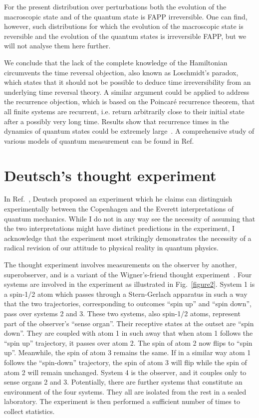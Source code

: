 \documentclass[12pt]{article}
\begin{document}
For the present distribution over perturbations both the evolution of the macroscopic state and of the quantum state is FAPP irreversible. One can find, however, such distributions for which the evolution of the macroscopic state is reversible and the evolution of the quantum states is irreversible FAPP, but we will not analyse them here further. 

We conclude that the lack of the complete knowledge of the Hamiltonian circumvents the time reversal objection, also known as Loschmidt's paradox, which states that it should not be possible to deduce time irreversibility from an underlying time reversal theory. A similar argument could be applied to address the recurrence objection, which is based on the Poincar{\' e} recurrence theorem, that all finite systems are recurrent, i.e. return arbitrarily close to their initial state after a possibly very long time. Results show that recurrence times in the dynamics of quantum states could be extremely large~\cite{peres4}. A comprehensive study of various models of quantum measurement can be found in Ref.~\cite{balian}


\section{Deutsch's thought experiment}

In Ref.~\cite{deutsch}, Deutsch proposed an experiment which he claims can distinguish experimentally between the Copenhagen and the Everett interpretations of quantum mechanics. While I do not in any way see the necessity of assuming that the two interpretations might have distinct predictions in the experiment, I acknowledge that the experiment most strikingly demonstrates the necessity of a radical revision of our attitude to physical reality in quantum physics.

The thought experiment involves measurements on the observer by another, superobserver, and is a variant of the Wigner's-friend thought experiment~\cite{wigner1}. Four systems are involved in the experiment as illustrated in Fig.~\ref{figure2}. System 1 is a spin-1/2 atom which passes through a Stern-Gerlach apparatus in such a way that the two trajectories, corresponding to outcomes ``spin up'' and ``spin down'', pass over systems 2 and 3. These two systems, also spin-1/2 atoms, represent part of the observer's ``sense organ''. Their receptive states at the outset are ``spin down''. They are coupled with atom 1 in such away that when  atom 1 follows the ``spin up'' trajectory, it passes over atom 2. The spin of atom 2 now flips to ``spin up''. Meanwhile, the spin of atom 3 remains the same. If in a similar way atom 1 follows the ``spin-down'' trajectory, the spin of atom 3 will flip while the spin of atom 2 will remain unchanged. System 4 is the observer, and it couples only to sense organs 2 and 3. Potentially, there are further systems that constitute an environment of the four systems. They all are isolated from the rest in a sealed laboratory. The experiment is then performed a sufficient number of times to collect statistics.
\end{document}
